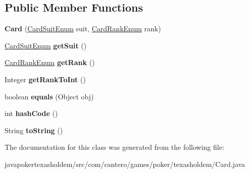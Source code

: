 \subsection*{Public Member Functions}
\begin{DoxyCompactItemize}
\item 
\hypertarget{classcom_1_1cantero_1_1games_1_1poker_1_1texasholdem_1_1_card_a16c8d06f3412767a96cc8217a9922841}{}{\bfseries Card} (\hyperlink{enumcom_1_1cantero_1_1games_1_1poker_1_1texasholdem_1_1_card_suit_enum}{Card\+Suit\+Enum} suit, \hyperlink{enumcom_1_1cantero_1_1games_1_1poker_1_1texasholdem_1_1_card_rank_enum}{Card\+Rank\+Enum} rank)\label{classcom_1_1cantero_1_1games_1_1poker_1_1texasholdem_1_1_card_a16c8d06f3412767a96cc8217a9922841}

\item 
\hypertarget{classcom_1_1cantero_1_1games_1_1poker_1_1texasholdem_1_1_card_ac84ab0db530262cded7b8bfee8452626}{}\hyperlink{enumcom_1_1cantero_1_1games_1_1poker_1_1texasholdem_1_1_card_suit_enum}{Card\+Suit\+Enum} {\bfseries get\+Suit} ()\label{classcom_1_1cantero_1_1games_1_1poker_1_1texasholdem_1_1_card_ac84ab0db530262cded7b8bfee8452626}

\item 
\hypertarget{classcom_1_1cantero_1_1games_1_1poker_1_1texasholdem_1_1_card_a22418ec66f1e3192135e3935f233e2d2}{}\hyperlink{enumcom_1_1cantero_1_1games_1_1poker_1_1texasholdem_1_1_card_rank_enum}{Card\+Rank\+Enum} {\bfseries get\+Rank} ()\label{classcom_1_1cantero_1_1games_1_1poker_1_1texasholdem_1_1_card_a22418ec66f1e3192135e3935f233e2d2}

\item 
\hypertarget{classcom_1_1cantero_1_1games_1_1poker_1_1texasholdem_1_1_card_a1c102ef221a7deb81c90bf1957dbf1a7}{}Integer {\bfseries get\+Rank\+To\+Int} ()\label{classcom_1_1cantero_1_1games_1_1poker_1_1texasholdem_1_1_card_a1c102ef221a7deb81c90bf1957dbf1a7}

\item 
\hypertarget{classcom_1_1cantero_1_1games_1_1poker_1_1texasholdem_1_1_card_a82b0ec86f2980195374142553e41705a}{}boolean {\bfseries equals} (Object obj)\label{classcom_1_1cantero_1_1games_1_1poker_1_1texasholdem_1_1_card_a82b0ec86f2980195374142553e41705a}

\item 
\hypertarget{classcom_1_1cantero_1_1games_1_1poker_1_1texasholdem_1_1_card_a2d86892532d2ecb23e53f15b3ee33286}{}int {\bfseries hash\+Code} ()\label{classcom_1_1cantero_1_1games_1_1poker_1_1texasholdem_1_1_card_a2d86892532d2ecb23e53f15b3ee33286}

\item 
\hypertarget{classcom_1_1cantero_1_1games_1_1poker_1_1texasholdem_1_1_card_ab5c2b972fe95c3ba36960359495b3d2b}{}String {\bfseries to\+String} ()\label{classcom_1_1cantero_1_1games_1_1poker_1_1texasholdem_1_1_card_ab5c2b972fe95c3ba36960359495b3d2b}

\end{DoxyCompactItemize}


The documentation for this class was generated from the following file\+:\begin{DoxyCompactItemize}
\item 
javapokertexasholdem/src/com/cantero/games/poker/texasholdem/Card.\+java\end{DoxyCompactItemize}
